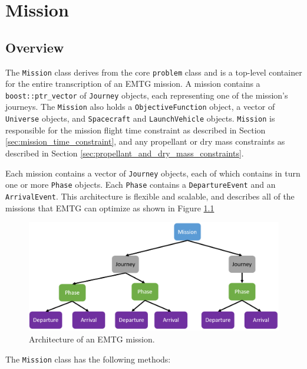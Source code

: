\chapter{Mission}
\label{chap:mission}

\section{Overview}
\label{sec:mission_overview}

The \texttt{Mission} class derives from the core \texttt{problem} class and is a top-level container for the entire transcription of an \ac{EMTG} mission. A mission contains a \texttt{boost::ptr\_vector} of \texttt{Journey} objects, each representing one of the mission's journeys. The \texttt{Mission} also holds a \texttt{ObjectiveFunction} object, a vector of \texttt{Universe} objects, and \texttt{Spacecraft} and \texttt{LaunchVehicle} objects. \texttt{Mission} is responsible for the mission flight time constraint as described in Section \ref{sec:mission_time_constraint}, and any propellant or dry mass constraints as described in Section \ref{sec:propellant_and_dry_mass_constraints}.

Each mission contains a vector of \texttt{Journey} objects, each of which contains in turn one or more \texttt{Phase} objects. Each \texttt{Phase} contains a \texttt{DepartureEvent} and an \texttt{ArrivalEvent}. This architecture is flexible and scalable, and describes all of the missions that \ac{EMTG} can optimize as shown in Figure \ref{fig:mission_architecture}

\begin{figure}
	\centering
	\includegraphics[width=0.9\linewidth]{./mission/EMTG_architecture_diagram.PNG}
	\caption{\label{fig:mission_architecture} Architecture of an \ac{EMTG} mission.}
\end{figure}

The \texttt{Mission} class has the following methods:

